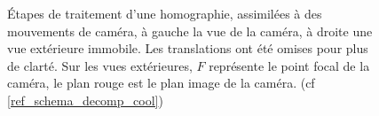 \begin{figure}
		\caption{Étapes de traitement d'une homographie, assimilées à des mouvements de caméra, à gauche la vue de la caméra, à droite une vue extérieure immobile. Les translations ont été omises pour plus de clarté. Sur les vues extérieures, $F$ représente le point focal de la caméra, le plan rouge est le plan image de la caméra. (cf \ref{ref_schema_decomp_cool})}
		\label{schema_decomp_cool}
		\label{SchemaEtapesDecompoGeometrique}
	\end{figure}
	\clearpage
